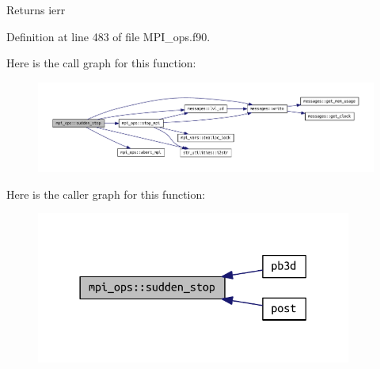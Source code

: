 \begin{DoxyReturn}{Returns}
ierr 
\end{DoxyReturn}


Definition at line 483 of file M\+P\+I\+\_\+ops.\+f90.

Here is the call graph for this function\+:\nopagebreak
\begin{figure}[H]
\begin{center}
\leavevmode
\includegraphics[width=350pt]{namespacempi__ops_a40e8610357a9a5b075fef9dab1c3f24f_cgraph}
\end{center}
\end{figure}
Here is the caller graph for this function\+:\nopagebreak
\begin{figure}[H]
\begin{center}
\leavevmode
\includegraphics[width=294pt]{namespacempi__ops_a40e8610357a9a5b075fef9dab1c3f24f_icgraph}
\end{center}
\end{figure}
